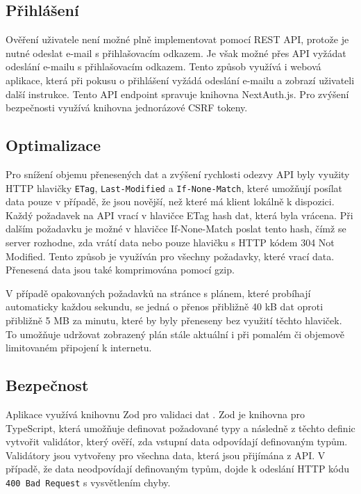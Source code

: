 \subsection{Přihlášení}

Ověření uživatele není možné plně implementovat pomocí REST API, protože je nutné odeslat e-mail s přihlašovacím odkazem.
Je však možné přes API vyžádat odeslání e-mailu s přihlašovacím odkazem. Tento způsob využívá i webová aplikace, která při pokusu o přihlášení
vyžádá odeslání e-mailu a zobrazí uživateli další instrukce. Tento API endpoint spravuje knihovna NextAuth.js. Pro zvýšení bezpečnosti využívá knihovna
jednorázové CSRF tokeny. 

\subsection{Optimalizace}

Pro snížení objemu přenesených dat a zvýšení rychlosti odezvy API byly využity HTTP hlavičky \texttt{ETag}, \texttt{Last-Modified} a \texttt{If-None-Match}, které umožňují
posílat data pouze v případě, že jsou novější, než které má klient lokálně k dispozici.
Každý požadavek na API vrací v hlavičce ETag hash dat, která byla vrácena. Při dalším požadavku je možné v hlavičce If-None-Match poslat tento hash,
čímž se server rozhodne, zda vrátí data nebo pouze hlavičku s HTTP kódem 304 Not Modified. Tento způsob je využíván pro všechny požadavky, které vrací data.
Přenesená data jsou také komprimována pomocí gzip.

V případě opakovaných požadavků na stránce s plánem, které probíhají automaticky každou sekundu, se jedná o přenos přibližně 40 kB dat oproti
přibližně 5 MB za minutu, které by byly přeneseny bez využití těchto hlaviček. To umožňuje udržovat zobrazený plán stále aktuální i při pomalém či objemově limitovaném
připojení k internetu.

\subsection{Bezpečnost}

Aplikace využívá knihovnu Zod pro validaci dat \cite{zod}. Zod je knihovna pro TypeScript, která umožňuje definovat požadované typy a následně z těchto definic
vytvořit validátor, který ověří, zda vstupní data odpovídají definovaným typům. Validátory jsou vytvořeny pro všechna data, která jsou přijímána z API.
V případě, že data neodpovídají definovaným typům, dojde k odeslání HTTP kódu \texttt{400 Bad Request} s vysvětlením chyby.

